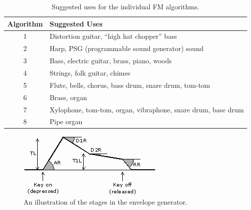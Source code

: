 \documentclass[12pt,a4paper]{article}
\begin{document}
\begin{table}[!htp]
\centering
\caption{Suggested uses for the individual FM algorithms.}
\label{tab:fm-algorithm-instruments}
\begin{tabular}{|c|l|}
\hline
\textbf{Algorithm} & \textbf{Suggested Uses}                             \\
\hline\hline
1         & Distortion guitar, ``high hat chopper'' bass                 \\
\hline
2         & Harp, PSG (programmable sound generator) sound               \\
\hline
3         & Bass, electric guitar, brass, piano, woods                   \\
\hline
4         & Strings, folk guitar, chimes                                 \\
\hline
5         & Flute, bells, chorus, bass drum, snare drum, tom-tom         \\
\hline
6         & Brass, organ                                                 \\
\hline
7         & Xylophone, tom-tom, organ, vibraphone, snare drum, base drum \\
\hline
8         & Pipe organ                                                   \\
\hline
\end{tabular}
\end{table}

\begin{figure}[!htp]
\centering
\caption{An illustration of the stages in the envelope generator.}
\label{fig:envelope-generator}
\includegraphics[width=\maxwidth{\textwidth}]{envelope}
\end{figure}


\clearpage
\renewcommand\refname{References \& Acknowledgments}
\nocite{*}


\end{document}
